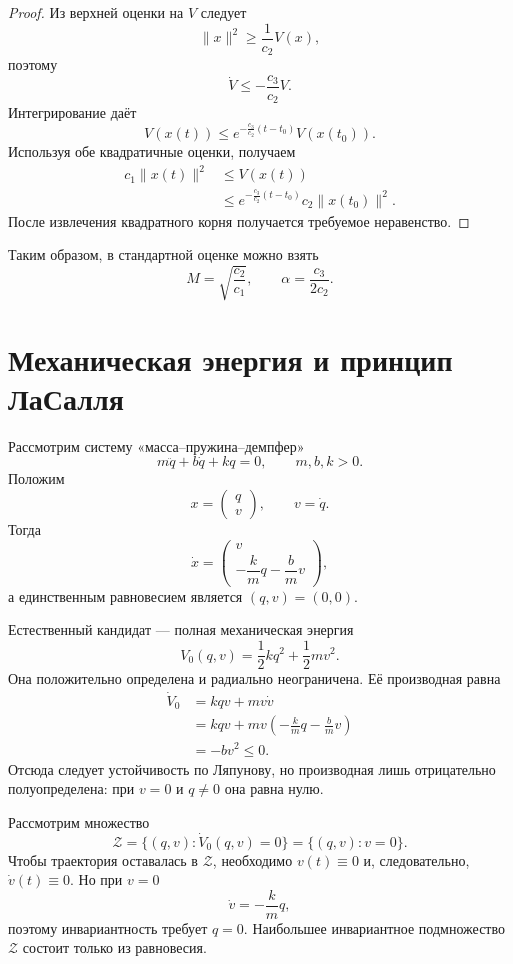 \begin{proof}
Из верхней оценки на \(V\) следует
\[
    \lVert x\rVert^2\ge\frac1{c_2}V(x),
\]
поэтому
\[
    \dot V\le-\frac{c_3}{c_2}V.
\]
Интегрирование даёт
\[
    V(x(t))
    \le
    e^{-\frac{c_3}{c_2}(t-t_0)}V(x(t_0)).
\]
Используя обе квадратичные оценки, получаем
\[
\begin{aligned}
    c_1\lVert x(t)\rVert^2
    &\le
    V(x(t))
    \\
    &\le
    e^{-\frac{c_3}{c_2}(t-t_0)}
    c_2\lVert x(t_0)\rVert^2.
\end{aligned}
\]
После извлечения квадратного корня получается требуемое неравенство.
\end{proof}

Таким образом, в стандартной оценке можно взять
\[
    M=\sqrt{\frac{c_2}{c_1}},
    \qquad
    \alpha=\frac{c_3}{2c_2}.
\]

\section{Механическая энергия и принцип ЛаСалля}

Рассмотрим систему «масса--пружина--демпфер»
\[
    m\ddot q+b\dot q+kq=0,
    \qquad
    m,b,k>0.
\]
Положим
\[
    x=
    \begin{pmatrix}
        q\\
        v
    \end{pmatrix},
    \qquad
    v=\dot q.
\]
Тогда
\[
    \dot x
    =
    \begin{pmatrix}
        v\\[1mm]
        -\dfrac{k}{m}q-\dfrac{b}{m}v
    \end{pmatrix},
\]
а единственным равновесием является \((q,v)=(0,0)\).

Естественный кандидат --- полная механическая энергия
\[
    V_0(q,v)
    =
    \frac12kq^2+\frac12mv^2.
\]
Она положительно определена и радиально неограничена. Её производная
равна
\[
\begin{aligned}
    \dot V_0
    &=
    kqv+mv\dot v
    \\
    &=
    kqv+mv
    \left(
        -\frac{k}{m}q-\frac{b}{m}v
    \right)
    \\
    &=
    -bv^2
    \le0.
\end{aligned}
\]
Отсюда следует устойчивость по Ляпунову, но производная лишь
отрицательно полуопределена: при \(v=0\) и \(q\ne0\) она равна нулю.

Рассмотрим множество
\[
    \mathcal Z
    =
    \{(q,v):\dot V_0(q,v)=0\}
    =
    \{(q,v):v=0\}.
\]
Чтобы траектория оставалась в \(\mathcal Z\), необходимо
\(v(t)\equiv0\) и, следовательно, \(\dot v(t)\equiv0\). Но при \(v=0\)
\[
    \dot v=-\frac{k}{m}q,
\]
поэтому инвариантность требует \(q=0\). Наибольшее инвариантное
подмножество \(\mathcal Z\) состоит только из равновесия.

